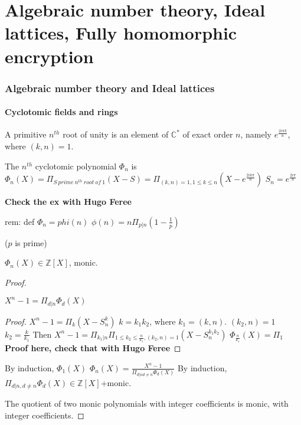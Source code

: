 \part{Algebraic number theory, Ideal lattices, Fully homomorphic encryption}

\section{Algebraic number theory and Ideal lattices}

\subsection{Cyclotomic fields and rings}

\begin{definition}
A primitive $n^{th}$ root of unity is an element of $\mathbb{C}^*$ of exact order $n$, namely $e^{\frac{2 i \pi k}{n}}$, where $(k,n)=1$.
\end{definition}

\begin{definition}
The $n^{th}$ cyclotomic polynomial $\Phi_n$  is $\Phi_n(X) = \Pi_{S \ prime \ n^{th} \ root \ of \ 1} (X-S)=\Pi_{(k,n)=1, 1 \leq k \leq n} (X - e^{\frac{2 i k \pi}{n}})$
$S_n=e^{\frac{2 i \pi}{n}}$
\end{definition}

\textbf{Check the ex with Hugo Feree}

rem: def $\Phi_n=phi(n)$
$\phi(n)=n \Pi_{p|n} (1-\frac{1}{p})$

($p$ is prime)

\begin{proposition}
$\Phi_n(X) \in \mathbb{Z}[X]$, monic.
\end{proposition}

\begin{proof}
\begin{lemm}
$X^n-1=\Pi_{d | n} \Phi_d(X)$
\end{lemm}
\begin{proof}
$X^n-1=\Pi_k (X-S_n^k)$
$k = k_1 k_2$, where $k_1=(k,n)$. $(k_2,n)=1$ $k_2=\frac{k}{k_1}$
Then $X^n-1= \Pi_{k_1 | n} \Pi_{1 \leq k_2 \leq \frac{n}{k_1}, (k_2,n)=1} (X-S_n^{k_1 k_2})$
$\Phi_{\frac{n}{k_1}}(X)=\Pi_{1}$
 \textbf{Proof here, check that with Hugo Feree}
\end{proof}
By induction, $\Phi_1(X)$
$\Phi_n(X)=\frac{X^n-1}{\Pi_{d | n d \neq n} \Phi_d(X)}$
By induction, $\Pi_{d | n, d \neq n} \Phi_d(X) \in \mathbb{Z}[X]$+monic.

The quotient of two monic polynomials with integer coefficients is monic, with integer coefficients.
\end{proof}

